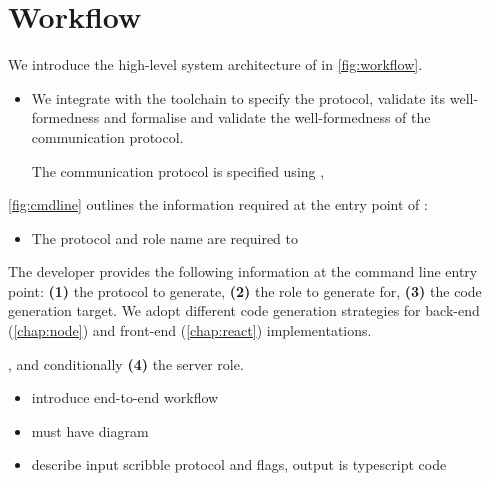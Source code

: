 \section{Workflow}

We introduce the high-level system architecture of 
in \cref{fig:workflow}.

\begin{itemize}

\item We integrate with the  toolchain to
specify the protocol, validate its well-formedness and 
formalise and validate the well-formedness of the communication protocol.

The communication protocol is specified using ,


\end{itemize}

\cref{fig:cmdline} outlines the information required at the entry
point of :

\begin{itemize}

\item The protocol and role name are required to 

\end{itemize}

The developer provides the following information at the 
command line entry point:
\textbf{(1)} the protocol to generate,
\textbf{(2)} the role to generate for, 
\textbf{(3)} the code generation target.
We adopt different code generation strategies for back-end 
(\cref{chap:node}) and front-end (\cref{chap:react}) implementations.


, and conditionally
\textbf{(4)} the server role.



\begin{itemize}
\item introduce end-to-end workflow
\item must have diagram
\item describe input scribble protocol and flags, output is typescript code
\end{itemize}